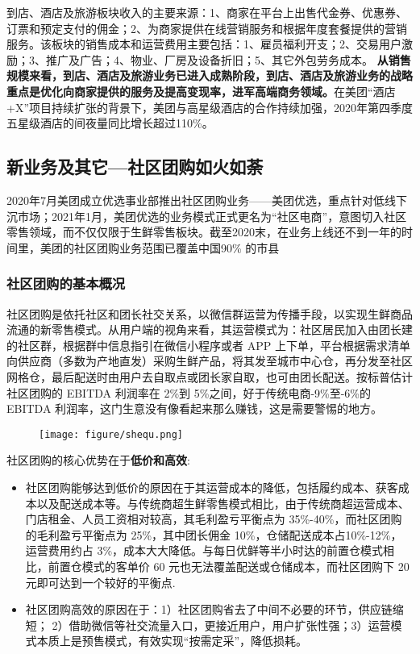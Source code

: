 \documentclass[UTF8,a4paper,12pt,lang=cn,fontset = windows]{elegantpaper} %
\begin{document}
到店、酒店及旅游板块收入的主要来源：1、商家在平台上出售代金券、优惠券、订票和预定支付的佣金；2、为商家提供在线营销服务和根据年度套餐提供的营销服务。该板块的销售成本和运营费用主要包括：1、雇员福利开支；2、交易用户激励；3、推广及广告；4、物业、厂房及设备折旧；5、其它外包劳务成本。
\textbf{从销售规模来看，到店、酒店及旅游业务已进入成熟阶段，到店、酒店及旅游业务的战略重点是优化向商家提供的服务及提高变现率，进军高端商务领域。}在美团“酒店+X”项目持续扩张的背景下，美团与高星级酒店的合作持续加强，2020年第四季度五星级酒店的间夜量同比增长超过110\%。

\subsection{新业务及其它—社区团购如火如荼}
2020年7月美团成立优选事业部推出社区团购业务——美团优选，重点针对低线下沉市场；2021年1月，美团优选的业务模式正式更名为“社区电商”，意图切入社区零售领域，而不仅仅限于生鲜零售板块。截至2020末，在业务上线还不到一年的时间里，美团的社区团购业务范围已覆盖中国90\%
的市县

\subsubsection{社区团购的基本概况}
社区团购是依托社区和团长社交关系，以微信群运营为传播手段，以实现生鲜商品流通的新零售模式。从用户端的视角来看，其运营模式为：社区居民加入由团长建的社区群，根据群中信息指引在微信小程序或者 APP 上下单，平台根据需求清单向供应商（多数为产地直发）采购生鲜产品，将其发至城市中心仓，再分发至社区网格仓，最后配送时由用户去自取点或团长家自取，也可由团长配送。按标普估计社区团购的 EBITDA 利润率在 2\%到 5\%之间，好于传统电商-9\%至-6\%的 EBITDA 利润率，这门生意没有像看起来那么赚钱，这是需要警惕的地方。
\begin{figure}[htbp]
  \centering
  \texttt{[image: figure/shequ.png]}
  \end{figure}

社区团购的核心优势在于\textbf{低价和高效}:
\begin{itemize}
  \item \noindent 社区团购能够达到低价的原因在于其运营成本的降低，包括履约成本、获客成本以及配送成本等。与传统商超生鲜零售模式相比，由于传统商超运营成本、门店租金、人员工资相对较高，其毛利盈亏平衡点为 35\%-40\%，而社区团购的毛利盈亏平衡点为 25\%，其中团长佣金 10\%，仓储配送成本占10\%-12\%，运营费用约占 3\%，成本大大降低。与每日优鲜等半小时达的前置仓模式相比，前置仓模式的客单价 60 元也无法覆盖配送或仓储成本，而社区团购下 20 元即可达到一个较好的平衡点.
  
  \item \noindent 社区团购高效的原因在于：1）社区团购省去了中间不必要的环节，供应链缩短；
  2）借助微信等社交流量入口，更接近用户，用户扩张性强；3）运营模式本质上是预售模式，有效实现“按需定采”，降低损耗。

  \end{itemize}
\end{document}
